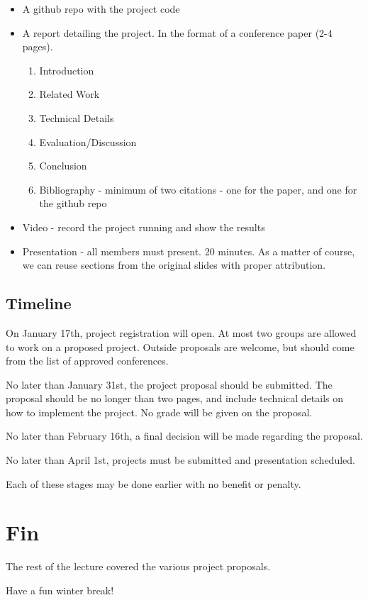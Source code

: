 \documentclass{idc_msc}
\begin{document}
\begin{itemize}
  \item A github repo with the project code
  \item A report detailing the project. In the format of a conference paper (2-4 pages).
    \begin{enumerate}
      \item Introduction
      \item Related Work
      \item Technical Details
      \item Evaluation/Discussion
      \item Conclusion
      \item Bibliography - minimum of two citations - one for the paper, and one for the github repo
    \end{enumerate}
  \item Video - record the project running and show the results
  \item Presentation - all members must present. 20 minutes.
  As a matter of course, we can reuse sections from the original slides with proper attribution.
\end{itemize}

\subsection{Timeline}

On January 17th, project registration will open. At most two groups are allowed to work on a proposed project.
Outside proposals are welcome, but should come from the list of approved conferences.

No later than January 31st, the project proposal should be submitted.
The proposal should be no longer than two pages, and include technical details on how to implement the project.
No grade will be given on the proposal.

No later than February 16th, a final decision will be made regarding the proposal.

No later than April 1st, projects must be submitted and presentation scheduled.

Each of these stages may be done earlier with no benefit or penalty.

\section{Fin}

The rest of the lecture covered the various project proposals.

Have a fun winter break!
\end{document}
